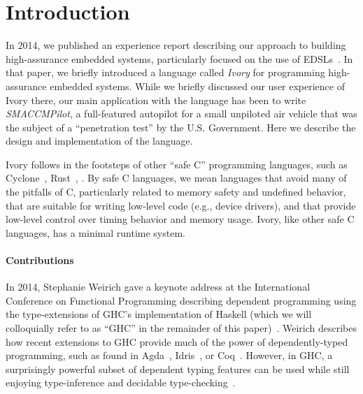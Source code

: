 \section{Introduction}
\label{sec:introduction}



In 2014, we published an experience report describing our approach to building
high-assurance embedded systems, particularly focused on the use of
EDSLs~\cite{smaccm}. In that paper, we briefly introduced a language called
\emph{Ivory} for programming high-assurance embedded systems. While we briefly
discussed our user experience of Ivory there, our main application with the
language has been to write \emph{SMACCMPilot}, a full-featured autopilot for a
small unpiloted air vehicle that was the subject of a ``penetration test'' by
the U.S. Government. Here we describe the design and implementation of the
language.

Ivory follows in the footsteps of other ``safe C'' programming languages, such
as Cyclone~\cite{}, Rust~\cite{}, . By safe C languages, we mean
languages that avoid many of the pitfalls of C, particularly related to memory
safety and undefined behavior, that are suitable for writing low-level code
(e.g., device drivers), and that provide low-level control over timing behavior
and memory usage. Ivory, like other safe C languages, has a minimal runtime
system.

\paragraph{Contributions}
In 2014, Stephanie Weirich gave a keynote address at the International
Conference on Functional Programming describing dependent programming using the
type-extensions of GHC's implementation of Haskell (which we will colloquially
refer to as ``GHC'' in the remainder of this
paper)~\cite{weirich-keynote}. Weirich describes how recent extensions to GHC
provide much of the power of dependently-typed programming, such as found in
Agda~\cite{}, Idris~\cite{}, or Coq~\cite{}. However, in GHC, a surprisingly
powerful subset of dependent typing features can be used while still enjoying
type-inference and decidable type-checking~\cite{dephaskell}.

